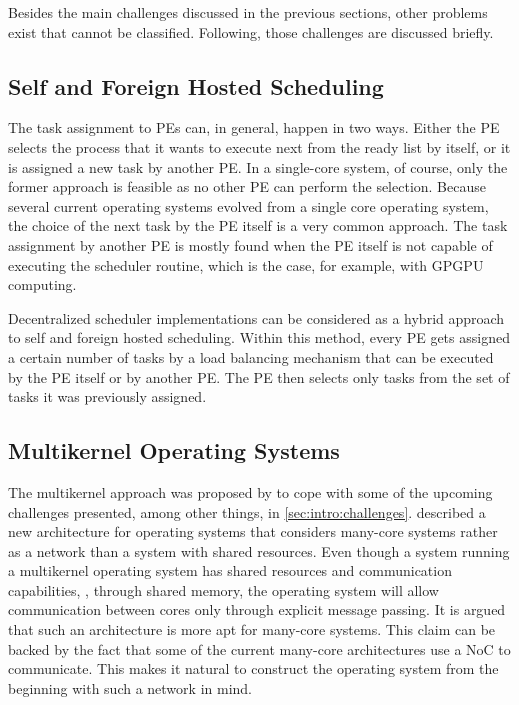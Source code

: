 Besides the main challenges discussed in the previous sections, other problems exist that cannot be classified. Following, those challenges are discussed briefly.

\subsection{Self and Foreign Hosted Scheduling}%
\label{sec:selfforeign}

The task assignment to \acp{PE} can, in general, happen in two ways. Either the \ac{PE} selects the process that it wants to execute next from the ready list by itself, or it is assigned a new task by another \ac{PE}. In a single-core system, of course, only the former approach is feasible as no other \ac{PE} can perform the selection. Because several current operating systems evolved from a single core operating system, the choice of the next task by the \ac{PE} itself is a very common approach. The task assignment by another \ac{PE} is mostly found when the \ac{PE} itself is not capable of executing the scheduler routine, which is the case, for example, with \ac{GPGPU} computing.

Decentralized scheduler implementations can be considered as a hybrid approach to self and foreign hosted scheduling. Within this method, every \ac{PE} gets assigned a certain number of tasks by a load balancing mechanism that can be executed by the \ac{PE} itself or by another \ac{PE}. The \ac{PE} then selects only tasks from the set of tasks it was previously assigned.

\subsection{Multikernel Operating Systems}

The multikernel approach was proposed by \textcite{Baumann-2009-Multikernel} to cope with some of the upcoming challenges presented, among other things, in \cref{sec:intro:challenges}.  described a new architecture for operating systems that considers many-core systems rather as a network than a system with shared resources. Even though a system running a multikernel operating system has shared resources and communication capabilities, \eg, through shared memory, the operating system will allow communication between cores only through explicit message passing. It is argued that such an architecture is more apt for many-core systems. This claim can be backed by the fact that some of the current many-core architectures use a \ac{NoC} to communicate. This makes it natural to construct the operating system from the beginning with such a network in mind.


